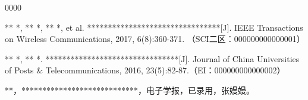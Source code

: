 \begin{publications}{0000}


    \item [{[1]}]  ** *, ** *, ** *, et al. ********************************[J]. IEEE Transactions on Wireless Communications, 2017, 6(8):360-371. （SCI二区：000000000000001）

    \item [{[2]}] ** *, ** *. ********************************[J]. Journal of China Universities of Posts \& Telecommunications, 2016, 23(5):82-87.（EI：000000000000002）

    \item [{[3]}] **，****************************，电子学报，已录用，张嫚嫚。


\end{publications}










